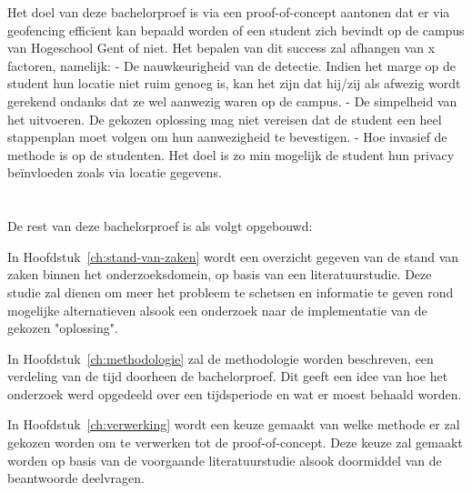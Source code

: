 Het doel van deze bachelorproef is via een proof-of-concept aantonen dat er via geofencing efficïent kan bepaald worden of een student zich bevindt op de campus van Hogeschool Gent of niet. Het bepalen van dit success zal afhangen van x factoren, namelijk:
- De nauwkeurigheid van de detectie. Indien het marge op de student hun locatie niet ruim genoeg is, kan het zijn dat hij/zij als afwezig wordt gerekend ondanks dat ze wel aanwezig waren op de campus.
- De simpelheid van het uitvoeren. De gekozen oplossing mag niet vereisen dat de student een heel stappenplan moet volgen om hun aanwezigheid te bevestigen. 
- Hoe invasief de methode is op de studenten. Het doel is zo min mogelijk de student hun privacy beïnvloeden zoals via locatie gegevens. %

\section{}%
\label{sec:opzet-bachelorproef}


De rest van deze bachelorproef is als volgt opgebouwd:

In Hoofdstuk~\ref{ch:stand-van-zaken} wordt een overzicht gegeven van de stand van zaken binnen het onderzoeksdomein, op basis van een literatuurstudie. Deze studie zal dienen om meer het probleem te schetsen en informatie te geven rond mogelijke alternatieven alsook een onderzoek naar de implementatie van de gekozen "oplossing". 

In Hoofdstuk~\ref{ch:methodologie} zal de methodologie worden beschreven, een verdeling van de tijd doorheen de bachelorproef. Dit geeft een idee van hoe het onderzoek werd opgedeeld over een tijdsperiode en wat er moest behaald worden.

In Hoofdstuk~\ref{ch:verwerking} wordt een keuze gemaakt van welke methode er zal gekozen worden om te verwerken tot de proof-of-concept. Deze keuze zal gemaakt worden op basis van de voorgaande literatuurstudie alsook doormiddel van de beantwoorde deelvragen.

